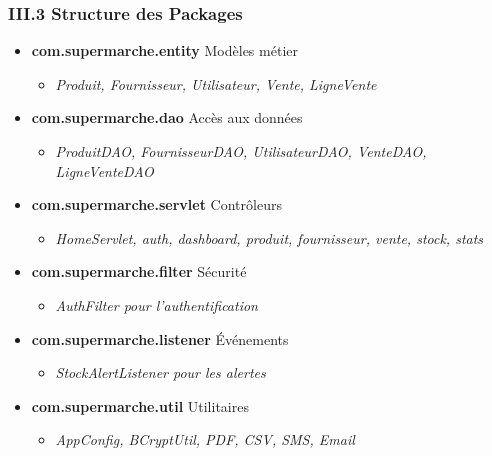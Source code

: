 \documentclass[11pt, aspectratio=169]{beamer}
\begin{document}
\begin{frame}
    \frametitle{III.3 Structure des Packages}
    
    \begin{small}
        \begin{itemize}
            \item \textbf{com.supermarche.entity} \quad Modèles métier
            \begin{itemize}
                \item \textit{Produit, Fournisseur, Utilisateur, Vente, LigneVente}
            \end{itemize}
            
            \item \textbf{com.supermarche.dao} \quad Accès aux données
            \begin{itemize}
                \item \textit{ProduitDAO, FournisseurDAO, UtilisateurDAO, VenteDAO, LigneVenteDAO}
            \end{itemize}
            
            \item \textbf{com.supermarche.servlet} \quad Contrôleurs
            \begin{itemize}
                \item \textit{HomeServlet, auth, dashboard, produit, fournisseur, vente, stock, stats}
            \end{itemize}
            
            \item \textbf{com.supermarche.filter} \quad Sécurité
            \begin{itemize}
                \item \textit{AuthFilter pour l'authentification}
            \end{itemize}
            
            \item \textbf{com.supermarche.listener} \quad Événements
            \begin{itemize}
                \item \textit{StockAlertListener pour les alertes}
            \end{itemize}
            
            \item \textbf{com.supermarche.util} \quad Utilitaires
            \begin{itemize}
                \item \textit{AppConfig, BCryptUtil, PDF, CSV, SMS, Email}
            \end{itemize}
        \end{itemize}
    \end{small}
\end{frame}
\end{document}
